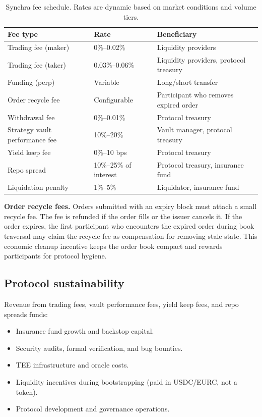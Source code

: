 \documentclass[11pt,a4paper]{article}
\begin{document}
\begin{table}[h]
  \centering
  \begin{tabular}{lll}
    \toprule
    \textbf{Fee type} & \textbf{Rate} & \textbf{Beneficiary} \\
    \midrule
    Trading fee (maker) & 0\%--0.02\% & Liquidity providers \\
    Trading fee (taker) & 0.03\%--0.06\% & Liquidity providers, protocol treasury \\
    Funding (perp) & Variable & Long/short transfer \\
    Order recycle fee & Configurable & Participant who removes expired order \\
    Withdrawal fee & 0\%--0.01\% & Protocol treasury \\
    Strategy vault performance fee & 10\%--20\% & Vault manager, protocol treasury \\
    Yield keep fee & 0\%--10 bps & Protocol treasury \\
    Repo spread & 10\%--25\% of interest & Protocol treasury, insurance fund \\
    Liquidation penalty & 1\%--5\% & Liquidator, insurance fund \\
    \bottomrule
  \end{tabular}
  \caption{Synchra fee schedule. Rates are dynamic based on market conditions and volume tiers.}
  \label{tab:fees}
\end{table}

\textbf{Order recycle fees.} Orders submitted with an expiry block must attach a small recycle fee. The fee is refunded if the order fills or the issuer cancels it. If the order expires, the first participant who encounters the expired order during book traversal may claim the recycle fee as compensation for removing stale state. This economic cleanup incentive keeps the order book compact and rewards participants for protocol hygiene.

\subsection{Protocol sustainability}

Revenue from trading fees, vault performance fees, yield keep fees, and repo spreads funds:
\begin{itemize}
  \item Insurance fund growth and backstop capital.
  \item Security audits, formal verification, and bug bounties.
  \item TEE infrastructure and oracle costs.
  \item Liquidity incentives during bootstrapping (paid in USDC/EURC, not a token).
  \item Protocol development and governance operations.
\end{itemize}
\end{document}
